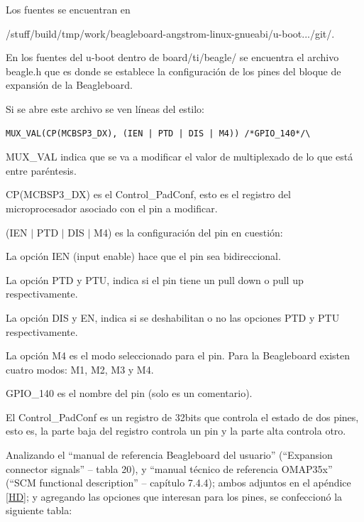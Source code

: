 \bigskip
Los fuentes se encuentran en 

/stuff/build/tmp/work/beagleboard-angstrom-linux-gnueabi/u-boot.../git/.

\bigskip
En los fuentes del u-boot dentro de board/ti/beagle/ se encuentra el archivo beagle.h que es donde se establece la configuración de los pines del bloque de expansión de la Beagleboard.

Si se abre este archivo se ven líneas del estilo: 

\begin{verbatim}
MUX_VAL(CP(MCBSP3_DX), (IEN | PTD | DIS | M4)) /*GPIO_140*/\
\end{verbatim}

MUX\_VAL indica que se va a modificar el valor de multiplexado de lo que está entre paréntesis. 

\bigskip
CP(MCBSP3\_DX) es el Control\_PadConf, esto es el registro del microprocesador asociado con el 
pin a modificar. 

\bigskip
(IEN $|$ PTD $|$ DIS $|$ M4) es la configuración del pin en cuestión: 


La opción IEN (input enable) hace que el pin sea bidireccional. 

La opción PTD y PTU, indica si el pin tiene un pull down o pull up respectivamente. 

La opción DIS y EN, indica si se deshabilitan o no las opciones PTD y PTU respectivamente. 

La opción M4 es el modo seleccionado para el pin. Para la Beagleboard existen cuatro modos: M1, M2, M3 y M4.

\bigskip
GPIO\_140 es el nombre del pin (solo es un comentario). 

\bigskip
El Control\_PadConf es un registro de 32bits que controla el estado de dos pines, esto es, la parte 
baja del registro controla un pin y la parte alta controla otro. 

Analizando el “manual de referencia Beagleboard del usuario” (“Expansion connector signals” – tabla 20), y “manual técnico de referencia OMAP35x” (“SCM functional description” – capítulo 7.4.4); ambos adjuntos en el apéndice \ref{HD}; y agregando las opciones que interesan para los pines, se confeccionó la siguiente tabla: 


